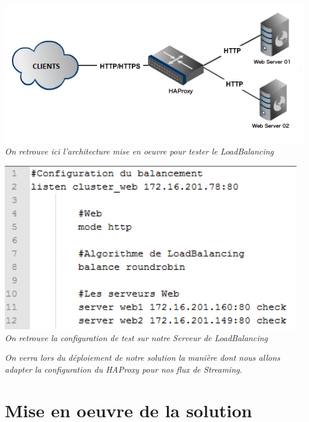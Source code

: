 \documentclass{report}
\begin{document}
    \begin{center}
    \includegraphics[width=14cm]{img/lb2.png}
    \\
    \textit{\small{On retrouve ici l'architecture mise en oeuvre pour tester le LoadBalancing}}
    \end{center}
    
    \hfill
    
    \begin{center}
    \includegraphics[width=13cm]{img/lb.PNG}
    \\
    \textit{\small{On retrouve la configuration de test sur notre Serveur de LoadBalancing}}
    \end{center}
    
    
    \hfill
    
    \begin{center}
    \textit{On verra lors du déploiement de notre solution la manière dont nous allons adapter la configuration du HAProxy pour nos flux de Streaming.}
    \end{center}
    
    
    
    
    
    
\chapter{Mise en oeuvre de la solution}
\end{document}
